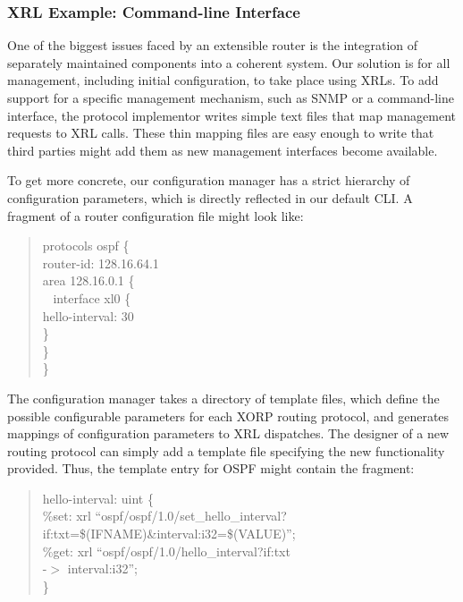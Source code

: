 \subsubsection{XRL Example: Command-line Interface}

One of the biggest issues faced by an {extensible} router is 
the integration of separately maintained components into a coherent
system.  
Our solution is for all management, including initial configuration, to
take place using XRLs.  To add support for a specific management
mechanism, such as SNMP or a command-line interface, the protocol
implementor writes simple text files that map management requests to
XRL calls.  These thin mapping files are easy enough to write that
third parties might add them as new management interfaces become
available.

To get more concrete, our configuration manager has a strict hierarchy
of configuration parameters, which is directly reflected in our
default CLI.  A fragment of a router configuration file might look
like:

\begin{quotation}
\noindent \sf \small protocols ospf \{\\
\parindent 10pt 
\indent     router-id: 128.16.64.1\\
\indent     area 128.16.0.1 \{\\\
\parindent 20pt 
\indent       interface xl0 \{\\
\parindent 30pt 
\indent         hello-interval: 30\\
\parindent 20pt 
\indent       \}\\
\parindent 10pt 
\indent     \}\\
\}
\end{quotation}

The configuration manager takes a directory of template files, which
define the possible configurable parameters for each XORP routing
protocol, and generates mappings of configuration parameters to XRL
dispatches.  The designer of a new routing protocol can simply add a
template file specifying the new functionality provided.  Thus, the
template entry for OSPF might contain the fragment:

\begin{quotation}
\noindent \sf \small hello-interval: uint \{ \\
\parindent 10pt 
\indent \%set: xrl ``ospf/ospf/1.0/set\_hello\_interval?\\
\parindent 60pt 
\indent if:txt=\$(IFNAME)\&interval:i32=\$(VALUE)'';\\
\parindent 10pt 
\indent \%get: xrl ``ospf/ospf/1.0/hello\_interval?if:txt\\
\parindent 60pt 
\indent -$>$ interval:i32'';\\
\}
\end{quotation}

